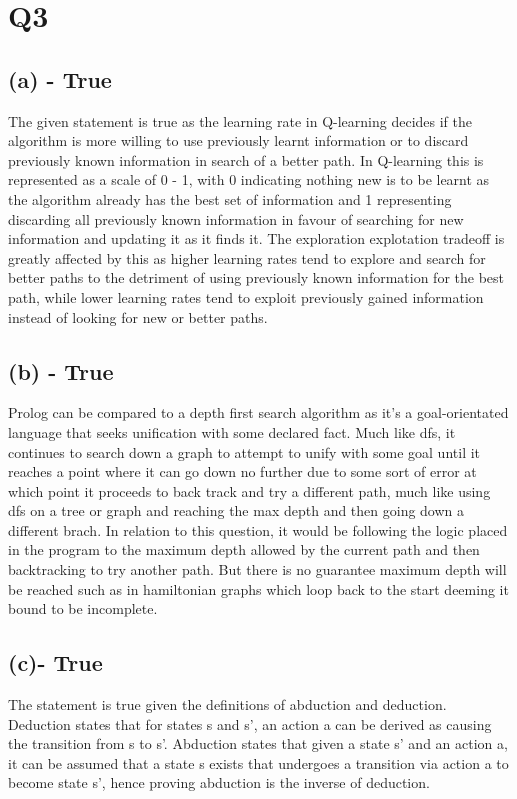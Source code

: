 \documentclass[11pt]{article} %
\begin{document}
\section{Q3}
\subsection{(a) - True}
The given statement is true as the learning rate in Q-learning decides if the algorithm is more willing to use previously learnt information or to discard previously known information in search of a better path. In Q-learning this is represented as a scale of 0 - 1, with 0 indicating nothing new is to be learnt as the algorithm already has the best set of information and 1 representing discarding all previously known information in favour of searching for new information and updating it as it finds it. The exploration explotation tradeoff is greatly affected by this as higher learning rates tend to explore and search for better paths to the detriment of using previously known information for the best path, while lower learning rates tend to exploit previously gained information instead of looking for new or better paths.

\subsection{(b) - True}
Prolog can be compared to a depth first search algorithm as it's a goal-orientated language that seeks unification with some declared fact. Much like dfs, it continues to search down a graph to attempt to unify with some goal until it reaches a point where it can go down no further due to some sort of error at which point it proceeds to back track and try a different path, much like using dfs on a tree or graph and reaching the max depth and then going down a different brach. In relation to this question, it would be following the logic placed in the program to the maximum depth allowed by the current path and then backtracking to try another path. But there is no guarantee maximum depth will be reached such as in hamiltonian graphs which loop back to the start deeming it bound to be incomplete.

\subsection{(c)- True}
The statement is true given the definitions of abduction and deduction. Deduction states that for states s and s', an action a can be derived as causing the transition from s to s'. Abduction states that given a state s' and an action a, it can be assumed that a state s exists that undergoes a transition via action a to become state s', hence proving abduction is the inverse of deduction.
\end{document}
